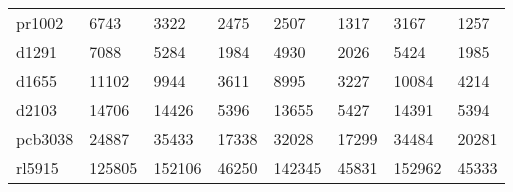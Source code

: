 \documentclass[english, 12pt, a4paper, sci, utf8, a-1b, online]{aaltothesis}
\begin{document}
\begin{table}[H]
\begin{tabular}{@{}llllllll@{}}
pr1002   & 6743                                                 & 3322                                                   & 2475                                                   & 2507                                                   & 1317                                                   & 3167                                                   & 1257                                                   \\
d1291    & 7088                                                 & 5284                                                   & 1984                                                   & 4930                                                   & 2026                                                   & 5424                                                   & 1985                                                   \\
d1655    & 11102                                                & 9944                                                   & 3611                                                   & 8995                                                   & 3227                                                   & 10084                                                  & 4214                                                   \\
d2103    & 14706                                                & 14426                                                  & 5396                                                   & 13655                                                  & 5427                                                   & 14391                                                  & 5394                                                   \\
pcb3038  & 24887                                                & 35433                                                  & 17338                                                  & 32028                                                  & 17299                                                  & 34484                                                  & 20281                                                  \\
rl5915   & 125805                                               & 152106                                                 & 46250                                                  & 142345                                                 & 45831                                                  & 152962                                                 & 45333                                                  \\

\end{tabular}
\end{table}
\end{document}
